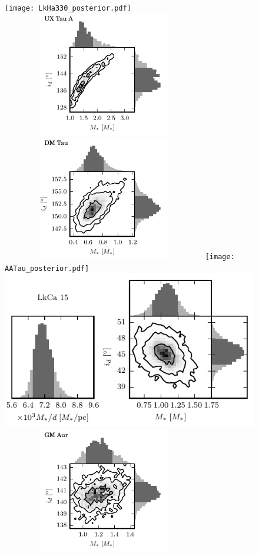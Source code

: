 \documentclass[twocolumn]{aastex6}
\begin{document}
\begin{figure}[htb]
\begin{center}
\texttt{[image: LkHa330\_posterior.pdf]}
\includegraphics[draft, width=3.5in, height=2.15in]{UXTauA_posterior.pdf}
\includegraphics[draft, width=3.5in, height=2.15in]{DMTau_posterior.pdf}
\texttt{[image: AATau\_posterior.pdf]}
\includegraphics{LkCa15_posterior.pdf}
\includegraphics[draft, width=3.5in, height=2.15in]{GMAur_posterior.pdf}

\end{center}
\end{figure}
\end{document}
